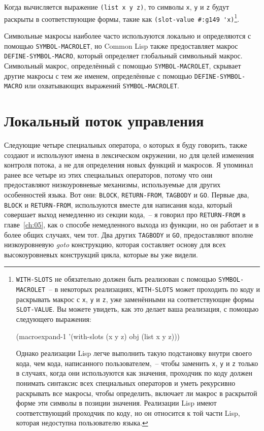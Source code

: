 Когда вычисляется выражение \lstinline{(list x y z)}, то символы \lstinline{x},
\lstinline{y} и \lstinline{z} будут раскрыты в соответствующие формы, такие как
\lstinline!(slot-value #:g149 'x)!\footnote{\lstinline{WITH-SLOTS} не обязательно должен
  быть реализован с помощью \lstinline{SYMBOL-MACROLET}~-- в некоторых реализациях,
  \lstinline{WITH-SLOTS} может проходить по коду и раскрывать макрос с \lstinline{x},
  \lstinline{y} и \lstinline{z}, уже заменёнными на соответствующие формы
  \lstinline{SLOT-VALUE}.  Вы можете увидеть, как это делает ваша реализация, с помощью
  следующего выражения:

\begin{myverb}
(macroexpand-1 '(with-slots (x y z) obj (list x y z)))
\end{myverb}

Однако реализации Lisp легче выполнить такую подстановку внутри своего кода, чем кода,
написанного пользователем,~-- чтобы заменить \lstinline{x}, \lstinline{y} и \lstinline{z}
только в случаях, когда они используются как значения, проходчик по коду должен понимать
синтаксис всех специальных операторов и уметь рекурсивно раскрывать все макросы, чтобы
определить, включает ли макрос в раскрытой форме эти символы в позиции значения.
Реализации Lisp имеют соответствующий проходчик по коду, но он относится к той части Lisp,
которая недоступна пользователю языка.}.

Символьные макросы наиболее часто используются локально и определяются с помощью
\lstinline{SYMBOL-MACROLET}, но Common Lisp также предоставляет макрос
\lstinline{DEFINE-SYMBOL-MACRO}, который определяет глобальный символьный макрос.  Символьный
макрос, определённый с помощью \lstinline{SYMBOL-MACROLET}, скрывает другие макросы с тем же
именем, определённые с помощью \lstinline{DEFINE-SYMBOL-MACRO} или охватывающих выражений
\lstinline{SYMBOL-MACROLET}.

\section{Локальный поток управления}

Следующие четыре специальных оператора, о которых я буду говорить, также создают и
используют имена в лексическом окружении, но для целей изменения контроля потока, а не для
определения новых функций и макросов. Я упоминал ранее все четыре из этих специальных
операторов, потому что они предоставляют низкоуровневые механизмы, используемые для других
особенностей языка. Вот они: \lstinline{BLOCK}, \lstinline{RETURN-FROM}, \lstinline{TAGBODY} и
\lstinline{GO}. Первые два, \lstinline{BLOCK} и \lstinline{RETURN-FROM}, используются вместе для
написания кода, который совершает выход немедленно из секции кода,~-- я говорил про
\lstinline{RETURN-FROM} в главе~\ref{ch:05}, как о способе немедленного выхода из функции, но
он работает и в более общих случаях, чем тот. Два других \lstinline{TAGBODY} и \lstinline{GO},
предоставляют вполне низкоуровневую \textit{goto} конструкцию, которая составляет основу для всех
высокоуровневых конструкций цикла, которые вы уже видели.

